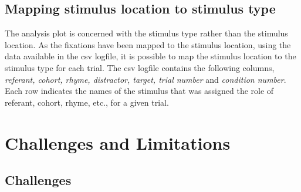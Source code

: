 \documentclass[
  a4paper,
]{article}
\begin{document}
\hypertarget{mapping-stimulus-location-to-stimulus-type}{%
\subsection{Mapping stimulus location to stimulus
type}\label{mapping-stimulus-location-to-stimulus-type}}

The analysis plot is concerned with the stimulus type rather than the
stimulus location. As the fixations have been mapped to the stimulus
location, using the data available in the csv logfile, it is possible to
map the stimulus location to the stimulus type for each trial. The csv
logfile contains the following columns, \emph{referant, cohort, rhyme,
distractor, target, trial number} and \emph{condition number}. Each row
indicates the names of the stimulus that was assigned the role of
referant, cohort, rhyme, etc., for a given trial.

\hypertarget{challenges-and-limitations}{%
\section{Challenges and Limitations}\label{challenges-and-limitations}}

\hypertarget{challenges}{%
\subsection{Challenges}\label{challenges}}
\end{document}
